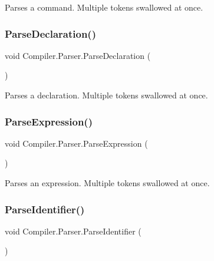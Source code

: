 Parses a command. Multiple tokens swallowed at once. \mbox{\label{class_compiler_1_1_parser_ab9718b82a785e63b848e51c39bbe8ee7}} 
\subsubsection{\texorpdfstring{Parse\+Declaration()}{ParseDeclaration()}}
{\footnotesize\ttfamily void Compiler.\+Parser.\+Parse\+Declaration (\begin{DoxyParamCaption}{ }\end{DoxyParamCaption})\hspace{0.3cm}{\ttfamily [protected]}}

Parses a declaration. Multiple tokens swallowed at once. \mbox{\label{class_compiler_1_1_parser_a8c6c2073d17ac572fb9117892cbf5aa1}} 
\subsubsection{\texorpdfstring{Parse\+Expression()}{ParseExpression()}}
{\footnotesize\ttfamily void Compiler.\+Parser.\+Parse\+Expression (\begin{DoxyParamCaption}{ }\end{DoxyParamCaption})\hspace{0.3cm}{\ttfamily [protected]}}

Parses an expression. Multiple tokens swallowed at once. \mbox{\label{class_compiler_1_1_parser_af099ac84308e83bf30b3dfd6dc51bd32}} 
\subsubsection{\texorpdfstring{Parse\+Identifier()}{ParseIdentifier()}}
{\footnotesize\ttfamily void Compiler.\+Parser.\+Parse\+Identifier (\begin{DoxyParamCaption}{ }\end{DoxyParamCaption})\hspace{0.3cm}{\ttfamily [protected]}}

